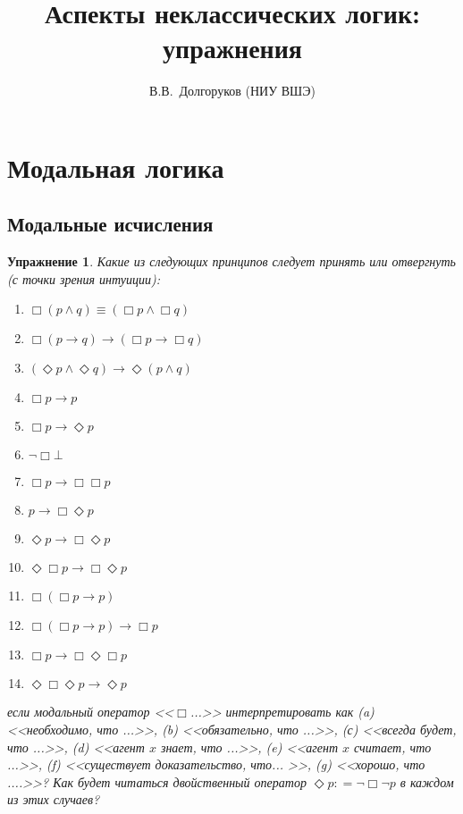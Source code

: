 \documentclass[11pt]{article}
\title{Аспекты неклассических логик: упражнения}
\author{В.В.~Долгоруков (НИУ ВШЭ)}
\newtheorem{exercise}[theorem]{Упражнение}
\begin{document}
\maketitle

\section{Модальная логика}
\subsection{Модальные исчисления}
\begin{exercise} Какие из следующих принципов следует принять или отвергнуть (с точки зрения интуиции):
\begin{multicols}{2}
\begin{enumerate}
\item $\Box (p \wedge q) \equiv (\Box p \wedge \Box q)$
\item $\Box (p \to q) \to (\Box p \to \Box q)$
\item $(\Diamond p \wedge \Diamond q) \to \Diamond (p \wedge q)$
\item $\Box p \to p$
\item $\Box p \to \Diamond p$
\item $\neg \Box \bot$	
\item $\Box p \to \Box \Box p$
\item $p \to \Box \Diamond p$
\item $\Diamond p \to \Box \Diamond p$
\item $\Diamond \Box p \to \Box \Diamond p$
\item $\Box (\Box p \to p)$
\item $\Box (\Box p \to p) \to \Box p$
\item $\Box p \to \Box \Diamond \Box p$
 \item $\Diamond \Box \Diamond p \to \Diamond p$
\end{enumerate}
\end{multicols}

если модальный оператор <<$\Box$...>> интерпретировать как
 (a) <<необходимо, что ...>>, (b) <<обязательно, что ...>>, (с) <<всегда будет, что ...>>, (d) <<агент $x$ знает, что ...>>, (e) <<агент $x$ считает, что ...>>, (f) <<существует доказательство, что... >>, (g) <<хорошо, что ....>>? Как будет читаться двойственный оператор $\Diamond p: = \neg \Box \neg p$ в каждом из этих случаев?
\end{exercise}
\end{document}
